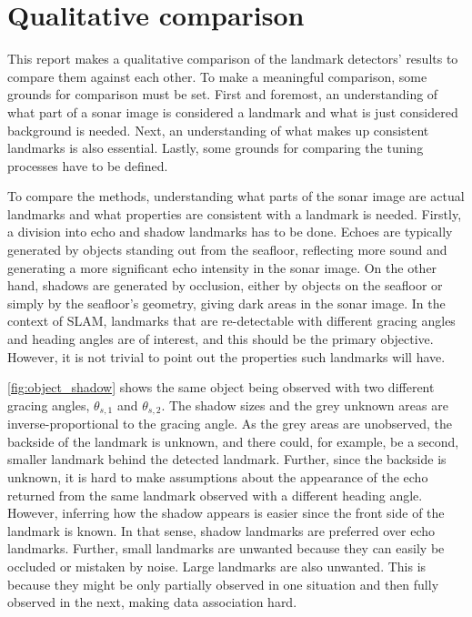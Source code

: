 \section{Qualitative comparison}

This report makes a qualitative comparison of the landmark detectors' results to compare them against each other. To make a meaningful comparison, some grounds for comparison must be set. First and foremost, an understanding of what part of a sonar image is considered a landmark and what is just considered background is needed. Next, an understanding of what makes up consistent landmarks is also essential. Lastly, some grounds for comparing the tuning processes have to be defined. 

To compare the methods, understanding what parts of the sonar image are actual landmarks and what properties are consistent with a landmark is needed. Firstly, a division into echo and shadow landmarks has to be done. Echoes are typically generated by objects standing out from the seafloor, reflecting more sound and generating a more significant echo intensity in the sonar image. On the other hand, shadows are generated by occlusion, either by objects on the seafloor or simply by the seafloor's geometry, giving dark areas in the sonar image. In the context of SLAM, landmarks that are re-detectable with different gracing angles and heading angles are of interest, and this should be the primary objective. However, it is not trivial to point out the properties such landmarks will have. 

\cref{fig:object_shadow} shows the same object being observed with two different gracing angles, $\theta_{s,1}$ and $\theta_{s,2}$. The shadow sizes and the grey unknown areas are inverse-proportional to the gracing angle. As the grey areas are unobserved, the backside of the landmark is unknown, and there could, for example, be a second, smaller landmark behind the detected landmark. Further, since the backside is unknown, it is hard to make assumptions about the appearance of the echo returned from the same landmark observed with a different heading angle. However, inferring how the shadow appears is easier since the front side of the landmark is known. In that sense, shadow landmarks are preferred over echo landmarks. Further, small landmarks are unwanted because they can easily be occluded or mistaken by noise. Large landmarks are also unwanted. This is because they might be only partially observed in one situation and then fully observed in the next, making data association hard. 

